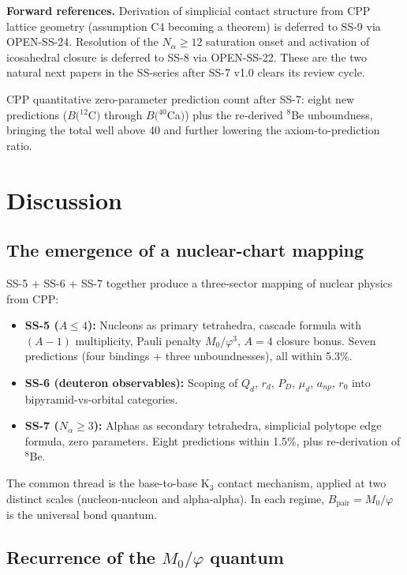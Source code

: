 \documentclass[11pt,letterpaper]{article}
\newcommand{\phig}{\varphi}
\newcommand{\Mzero}{M_0}
\newcommand{\Bpair}{B_{\mathrm{pair}}}
\newcommand{\Nalpha}{N_{\alpha}}
\begin{document}
\textbf{Forward references.} Derivation of simplicial contact structure from CPP lattice geometry (assumption C4 becoming a theorem) is deferred to SS-9 via OPEN-SS-24. Resolution of the $\Nalpha \geq 12$ saturation onset and activation of icosahedral closure is deferred to SS-8 via OPEN-SS-22. These are the two natural next papers in the SS-series after SS-7 v1.0 clears its review cycle.

CPP quantitative zero-parameter prediction count after SS-7: eight new predictions ($B({}^{12}$C$)$ through $B({}^{40}$Ca$)$) plus the re-derived ${}^8$Be unboundness, bringing the total well above 40 and further lowering the axiom-to-prediction ratio.

\section{Discussion}
\label{sec:discussion}

\subsection{The emergence of a nuclear-chart mapping}

SS-5 + SS-6 + SS-7 together produce a three-sector mapping of nuclear physics from CPP:
\begin{itemize}
\item \textbf{SS-5 ($A \leq 4$):} Nucleons as primary tetrahedra, cascade formula with $(A-1)$ multiplicity, Pauli penalty $\Mzero/\phig^3$, $A=4$ closure bonus. Seven predictions (four bindings + three unboundnesses), all within 5.3\%.
\item \textbf{SS-6 (deuteron observables):} Scoping of $Q_d$, $r_d$, $P_D$, $\mu_d$, $a_{np}$, $r_0$ into bipyramid-vs-orbital categories.
\item \textbf{SS-7 ($\Nalpha \geq 3$):} Alphas as secondary tetrahedra, simplicial polytope edge formula, zero parameters. Eight predictions within 1.5\%, plus re-derivation of ${}^8$Be.
\end{itemize}

The common thread is the base-to-base K$_3$ contact mechanism, applied at two distinct scales (nucleon-nucleon and alpha-alpha). In each regime, $\Bpair = \Mzero/\phig$ is the universal bond quantum.

\subsection{Recurrence of the $\Mzero/\phig$ quantum}
\end{document}
